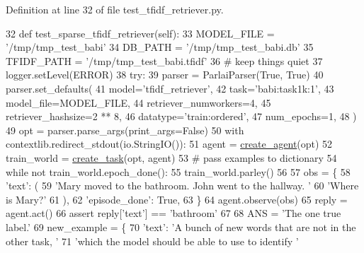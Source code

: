 Definition at line 32 of file test\+\_\+tfidf\+\_\+retriever.\+py.


\begin{DoxyCode}
32     \textcolor{keyword}{def }test\_sparse\_tfidf\_retriever(self):
33         MODEL\_FILE = \textcolor{stringliteral}{'/tmp/tmp\_test\_babi'}
34         DB\_PATH = \textcolor{stringliteral}{'/tmp/tmp\_test\_babi.db'}
35         TFIDF\_PATH = \textcolor{stringliteral}{'/tmp/tmp\_test\_babi.tfidf'}
36         \textcolor{comment}{# keep things quiet}
37         logger.setLevel(ERROR)
38         \textcolor{keywordflow}{try}:
39             parser = ParlaiParser(\textcolor{keyword}{True}, \textcolor{keyword}{True})
40             parser.set\_defaults(
41                 model=\textcolor{stringliteral}{'tfidf\_retriever'},
42                 task=\textcolor{stringliteral}{'babi:task1k:1'},
43                 model\_file=MODEL\_FILE,
44                 retriever\_numworkers=4,
45                 retriever\_hashsize=2 ** 8,
46                 datatype=\textcolor{stringliteral}{'train:ordered'},
47                 num\_epochs=1,
48             )
49             opt = parser.parse\_args(print\_args=\textcolor{keyword}{False})
50             with contextlib.redirect\_stdout(io.StringIO()):
51                 agent = \hyperlink{namespaceparlai_1_1core_1_1agents_a00d77a7e26fb89e8bd900f7b2a02982a}{create\_agent}(opt)
52                 train\_world = \hyperlink{namespaceparlai_1_1core_1_1worlds_a79969c7ba76d4b3c500f5bb776444dc6}{create\_task}(opt, agent)
53             \textcolor{comment}{# pass examples to dictionary}
54             \textcolor{keywordflow}{while} \textcolor{keywordflow}{not} train\_world.epoch\_done():
55                 train\_world.parley()
56 
57             obs = \{
58                 \textcolor{stringliteral}{'text'}: (
59                     \textcolor{stringliteral}{'Mary moved to the bathroom. John went to the hallway. '}
60                     \textcolor{stringliteral}{'Where is Mary?'}
61                 ),
62                 \textcolor{stringliteral}{'episode\_done'}: \textcolor{keyword}{True},
63             \}
64             agent.observe(obs)
65             reply = agent.act()
66             \textcolor{keyword}{assert} reply[\textcolor{stringliteral}{'text'}] == \textcolor{stringliteral}{'bathroom'}
67 
68             ANS = \textcolor{stringliteral}{'The one true label.'}
69             new\_example = \{
70                 \textcolor{stringliteral}{'text'}: \textcolor{stringliteral}{'A bunch of new words that are not in the other task, '}
71                 \textcolor{stringliteral}{'which the model should be able to use to identify '}

\end{DoxyCode}
